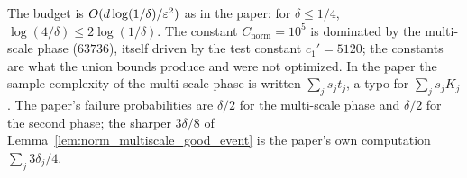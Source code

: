 \begin{remark}\label{rem:norm_constants}
The budget is $O(d\log(1/\delta)/\varepsilon^2)$ as in the paper: for $\delta \le 1/4$,
$\log(4/\delta) \le 2\log(1/\delta)$. The constant $C_{\mathrm{norm}} = 10^5$ is dominated by the
multi-scale phase ($63736$), itself driven by the test constant $c_1' = 5120$; the
constants are what the union bounds produce and were not optimized. In the paper the
sample complexity of the multi-scale phase is written $\sum_j s_jt_j$, a typo for
$\sum_j s_jK_j$. The paper's failure probabilities are $\delta/2$ for the multi-scale phase
and $\delta/2$ for the second phase; the sharper $3\delta/8$ of
Lemma~\ref{lem:norm_multiscale_good_event} is the paper's own computation
$\sum_j 3\delta_j/4$.
\end{remark}
